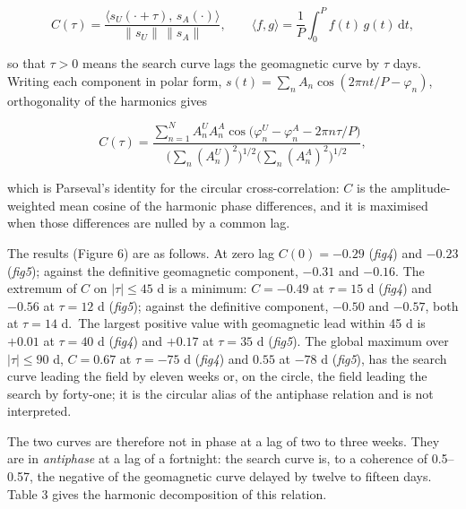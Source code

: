 \documentclass[
  10pt,
  a4paper,
]{article}
\begin{document}
\[C(\tau) = \frac{\langle s_U(\cdot + \tau),\, s_A(\cdot)\rangle}{\lVert s_U\rVert\,\lVert s_A\rVert}, \qquad \langle f, g\rangle = \frac{1}{P}\int_0^P f(t)\,g(t)\,\mathrm{d}t,\]

so that \(\tau > 0\) means the search curve lags the geomagnetic curve
by \(\tau\) days. Writing each component in polar form,
\(s(t) = \sum_n A_n\cos(2\pi n t/P - \varphi_n)\), orthogonality of the
harmonics gives

\[C(\tau) = \frac{\sum_{n=1}^{N} A^U_n A^A_n \cos\bigl(\varphi^U_n - \varphi^A_n - 2\pi n\tau/P\bigr)}{\bigl(\sum_n (A^U_n)^2\bigr)^{1/2}\bigl(\sum_n (A^A_n)^2\bigr)^{1/2}},\]

which is Parseval's identity for the circular cross-correlation: \(C\)
is the amplitude-weighted mean cosine of the harmonic phase differences,
and it is maximised when those differences are nulled by a common lag.

The results (Figure 6) are as follows. At zero lag \(C(0) = -0.29\)
(\emph{fig4}) and \(-0.23\) (\emph{fig5}); against the definitive
geomagnetic component, \(-0.31\) and \(-0.16\). The extremum of \(C\) on
\(|\tau| \le 45\) d is a minimum: \(C = -0.49\) at \(\tau = 15\) d
(\emph{fig4}) and \(-0.56\) at \(\tau = 12\) d (\emph{fig5}); against
the definitive component, \(-0.50\) and \(-0.57\), both at \(\tau = 14\)
d.~The largest positive value with geomagnetic lead within 45 d is
\(+0.01\) at \(\tau = 40\) d (\emph{fig4}) and \(+0.17\) at
\(\tau = 35\) d (\emph{fig5}). The global maximum over \(|\tau| \le 90\)
d, \(C = 0.67\) at \(\tau = -75\) d (\emph{fig4}) and \(0.55\) at
\(-78\) d (\emph{fig5}), has the search curve leading the field by
eleven weeks or, on the circle, the field leading the search by
forty-one; it is the circular alias of the antiphase relation and is not
interpreted.

The two curves are therefore not in phase at a lag of two to three
weeks. They are in \emph{antiphase} at a lag of a fortnight: the search
curve is, to a coherence of 0.5--0.57, the negative of the geomagnetic
curve delayed by twelve to fifteen days. Table 3 gives the harmonic
decomposition of this relation.
\end{document}
